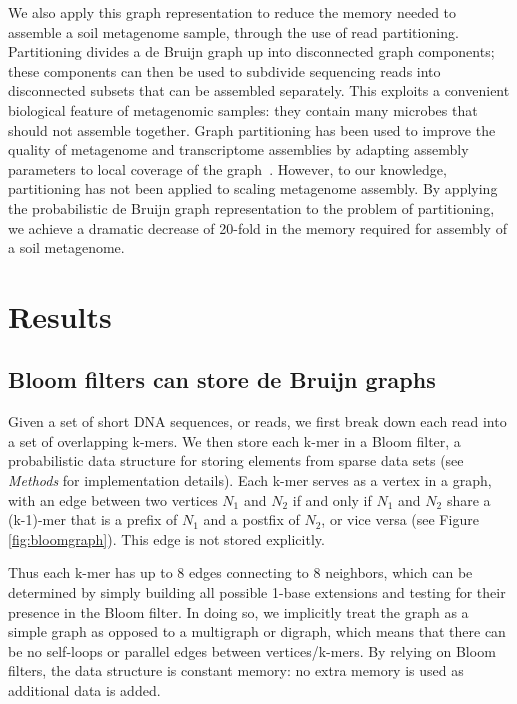 \documentclass{pnastwo}
\begin{document}
\begin{article}
We also apply this graph representation to reduce the memory needed
to assemble a soil metagenome sample, through
the use of read partitioning.  Partitioning divides a de Bruijn graph up
into disconnected graph components; these components can then be used to
subdivide sequencing reads into disconnected subsets that can be
assembled separately.
This exploits a convenient biological
feature of metagenomic samples: they contain many microbes that should
not assemble together.  Graph partitioning has
been used to improve the quality of metagenome and transcriptome assemblies
by adapting assembly parameters to local coverage of the graph~\cite{metavelvet,pubmed21685107,trinity}.  However, to our knowledge, partitioning has not been applied
to scaling metagenome assembly. By applying the
probabilistic de Bruijn graph representation to the problem of
partitioning, we achieve a dramatic decrease of 20-fold in the memory
required for assembly of a soil metagenome.


\section{Results}

\subsection{Bloom filters can store de Bruijn graphs}

Given a set of short DNA sequences, or reads, we first break down each
read into a set of overlapping k-mers.  We then store each k-mer in a
Bloom filter, a probabilistic data structure for storing elements from sparse data
sets (see \emph{Methods} for implementation details).  Each k-mer
serves as a vertex in a graph, with an edge between two vertices $N_1$
and $N_2$ if and only if $N_1$ and $N_2$ share a (k-1)-mer that is a
prefix of $N_1$ and a postfix of $N_2$, or vice versa (see Figure
\ref{fig:bloomgraph}).  This edge is not stored explicitly.

Thus each k-mer has up to 8 edges connecting to 8 neighbors, which can be determined by
simply building all possible 1-base extensions and testing for their
presence in the Bloom filter.  In doing so, we implicitly treat the
graph as a simple graph as opposed to a multigraph or digraph, which
means that there can be no self-loops or parallel edges between
vertices/k-mers.  By relying on Bloom filters, the data structure is
constant memory: no extra memory is used as additional data is
added.


\end{article}
\end{document}
